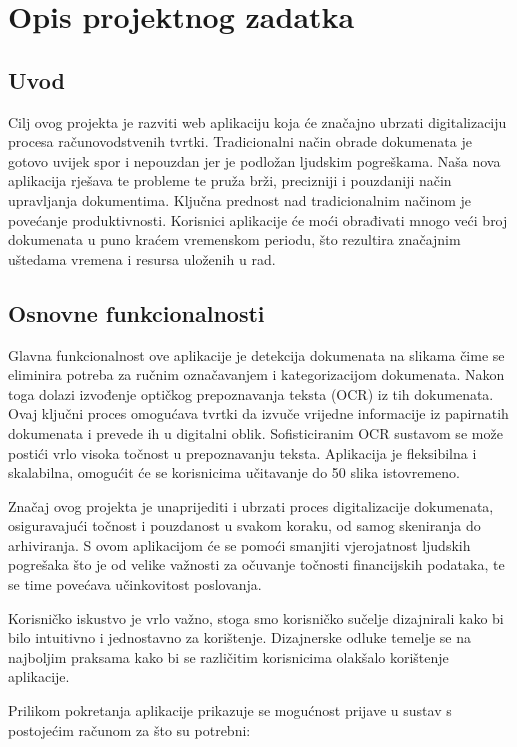 \chapter{Opis projektnog zadatka}
				
		\section{Uvod}
		Cilj ovog projekta je razviti web aplikaciju koja će značajno ubrzati digitalizaciju procesa računovodstvenih tvrtki. Tradicionalni način obrade dokumenata je gotovo uvijek spor i nepouzdan jer je podložan ljudskim pogreškama. Naša nova aplikacija rješava te probleme te pruža brži, precizniji i pouzdaniji način upravljanja dokumentima. Ključna prednost nad tradicionalnim načinom je povećanje produktivnosti. Korisnici aplikacije će moći obrađivati mnogo veći broj dokumenata u puno kraćem vremenskom periodu, što rezultira značajnim uštedama vremena i resursa uloženih u rad.
		\section{Osnovne funkcionalnosti}
		Glavna funkcionalnost ove aplikacije je detekcija dokumenata na slikama čime se eliminira potreba za ručnim označavanjem i kategorizacijom dokumenata. Nakon toga dolazi izvođenje optičkog prepoznavanja teksta (OCR) iz tih dokumenata. Ovaj ključni proces omogućava tvrtki da izvuče vrijedne informacije iz papirnatih dokumenata i prevede ih u digitalni oblik. Sofisticiranim OCR sustavom se može postići vrlo visoka točnost u prepoznavanju teksta. Aplikacija je fleksibilna i skalabilna, omogućit će se korisnicima učitavanje do 50 slika istovremeno. 
		
		Značaj ovog projekta je unaprijediti i ubrzati proces digitalizacije dokumenata, osiguravajući točnost i pouzdanost u svakom koraku, od samog skeniranja do arhiviranja. S ovom aplikacijom će se pomoći smanjiti vjerojatnost ljudskih pogrešaka što je od velike važnosti za očuvanje točnosti financijskih podataka, te se time povećava učinkovitost poslovanja.
		
		Korisničko iskustvo je vrlo važno, stoga smo korisničko sučelje dizajnirali kako bi bilo intuitivno i jednostavno za korištenje. Dizajnerske odluke temelje se na najboljim praksama kako bi se različitim korisnicima olakšalo korištenje aplikacije.
		
		Prilikom pokretanja aplikacije prikazuje se mogućnost prijave u sustav s postojećim računom za što su potrebni:
		\begin{packed_item}
			\item {}
			\item {}
		\end{packed_item}

